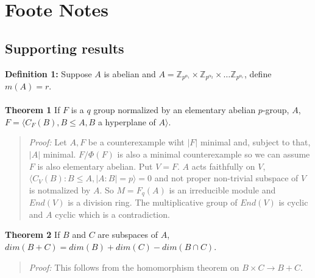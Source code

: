 \chapter{Foote Notes}
\section{Supporting results}
{\bf Definition 1:}  Suppose $A$ is abelian and
$A= {\mathbb Z}_{p^{\alpha_1}} \times {\mathbb Z}_{p^{\alpha_2}} \times \ldots {\mathbb Z}_{p^{\alpha_r}}$, define
$m(A)=r$.
\\
\\
{\bf Theorem 1} If $F$ is a $q$ group normalized by an elementary abelian $p$-group, $A$,
$F= \langle C_F(B), B \leq A, B$ a hyperplane of $A \rangle$.
\begin{quote}
\emph{Proof:}  
Let $A, F$ be a counterexample wiht $|F|$ minimal and, subject to that, $|A|$ minimal.
$F/\Phi(F)$ is also a minimal counterexample so we can assume $F$ is also elementary abelian.
Put $V=F$.
$A$ acts faithfully on $V$, $\langle C_V(B): B \leq A, |A:B|=p \rangle = 0$ and
not proper non-trivial subspace of $V$ is notmalized by $A$. So $M=F_q(A)$ is an irreducible
module and $End(V)$ is a division ring. The multiplicative group of $End(V)$ is cyclic and $A$ cyclic
which is a contradiction.
\end{quote}
{\bf Theorem 2} If $B$ and $C$ are subspaces of $A$, $dim(B+C)= dim(B) + dim(C)- dim(B \cap C)$.
\begin{quote}
\emph{Proof:}  This follows from the homomorphism theorem on $B \times C \rightarrow B+C$.
\end{quote}
